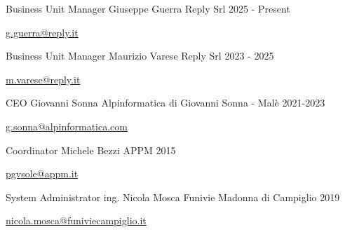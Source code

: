 


\newpage
{}

\begin{cventries}
\cventry
{Business Unit Manager} %
{Giuseppe Guerra} %
{Reply Srl} %
{2025 - Present} %
{
  \begin{cvitems} %
    \item {\href{mailto:g.guerra@reply.it}{g.guerra@reply.it}}
  \end{cvitems}
}

\cventry
{Business Unit Manager} %
{Maurizio Varese} %
{Reply Srl} %
{2023 - 2025} %
{
  \begin{cvitems} %
    \item {\href{mailto:m.varese@reply.it}{m.varese@reply.it}}
  \end{cvitems}
}

\cventry
{CEO} %
{Giovanni Sonna} %
{Alpinformatica di Giovanni Sonna - Malè} %
{2021-2023} %
{
  \begin{cvitems} %
    \item {\href{mailto:g.sonna@alpinformatica.com}{g.sonna@alpinformatica.com}}
  \end{cvitems}
}

  \cventry
    {Coordinator} %
    {Michele Bezzi} %
    {APPM} %
    {2015} %
    {
      \begin{cvitems} %
        \item {\href{mailto:pgvsole@appm.it}{pgvsole@appm.it}}
      \end{cvitems}
    }

  \cventry
    {System Administrator} %
    {ing. Nicola Mosca} %
    {Funivie Madonna di Campiglio} %
    {2019} %
    {
      \begin{cvitems} %
        \item {\href{mailto:nicola.mosca@funiviecampiglio.it}{nicola.mosca@funiviecampiglio.it}}
      \end{cvitems}
    }


\end{cventries}
